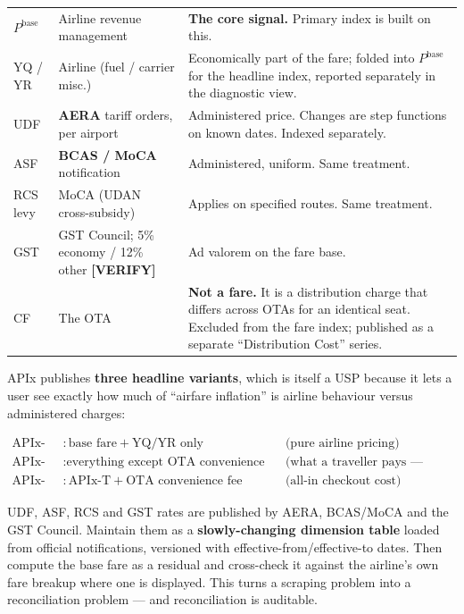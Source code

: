 \begin{center}
\small
\begin{tabularx}{\textwidth}{@{}L{2.1cm} L{4.4cm} X@{}}
\toprule
{} &  &  \\
\midrule
$P^{\text{base}}$ & Airline revenue management & \textbf{The core signal.} Primary index is built on this. \\
YQ / YR & Airline (fuel / carrier misc.) & Economically part of the fare; folded into $P^{\text{base}}$ for the headline index, reported separately in the diagnostic view. \\
UDF & \textbf{AERA} tariff orders, per airport & Administered price. Changes are step functions on known dates. Indexed separately. \\
ASF & \textbf{BCAS / MoCA} notification & Administered, uniform. Same treatment. \\
RCS levy & MoCA (UDAN cross-subsidy) & Applies on specified routes. Same treatment. \\
GST & GST Council; 5\% economy / 12\% other \textbf{[VERIFY]} & Ad valorem on the fare base. \\
CF & The OTA & \textbf{Not a fare.} It is a distribution charge that differs across OTAs for an identical seat. Excluded from the fare index; published as a separate ``Distribution Cost'' series. \\
\bottomrule
\end{tabularx}
\end{center}

\noindent APIx publishes \textbf{three headline variants}, which is itself a USP because it
lets a user see exactly how much of ``airfare inflation'' is airline behaviour versus
administered charges:

\begin{align}
\text{APIx-B} &: \text{base fare} + \text{YQ/YR only} && \text{(pure airline pricing)}\\
\text{APIx-T} &: \text{everything except OTA convenience fee} && \text{(what a traveller pays --- headline)}\\
\text{APIx-A} &: \text{APIx-T} + \text{OTA convenience fee} && \text{(all-in checkout cost)}
\end{align}

\begin{keybox}
 UDF, ASF, RCS and GST rates are published by
AERA, BCAS/MoCA and the GST Council. Maintain them as a \textbf{slowly-changing dimension
table} loaded from official notifications, versioned with effective-from/effective-to dates.
Then compute the base fare as a residual and cross-check it against the airline's own fare
breakup where one is displayed. This turns a scraping problem into a reconciliation problem
--- and reconciliation is auditable.
\end{keybox}

